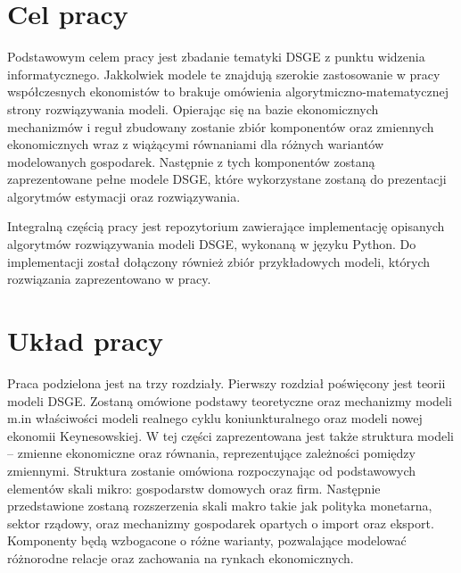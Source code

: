 \section*{Cel pracy}


Podstawowym celem pracy jest zbadanie tematyki DSGE z punktu widzenia informatycznego. Jakkolwiek modele te znajdują szerokie zastosowanie w pracy współczesnych ekonomistów to brakuje omówienia algorytmiczno-matematycznej strony rozwiązywania modeli. Opierając się na bazie ekonomicznych mechanizmów i reguł zbudowany zostanie zbiór komponentów oraz zmiennych ekonomicznych wraz z wiążącymi równaniami dla różnych wariantów modelowanych gospodarek. Następnie z tych komponentów zostaną zaprezentowane pełne modele DSGE, które wykorzystane zostaną do prezentacji algorytmów estymacji oraz rozwiązywania.



Integralną częścią pracy jest repozytorium zawierające implementację opisanych algorytmów rozwiązywania modeli DSGE, wykonaną w języku Python. Do implementacji został dołączony również zbiór przykładowych modeli, których rozwiązania zaprezentowano w pracy.

\section*{Układ pracy}

Praca podzielona jest na trzy rozdziały. Pierwszy rozdział poświęcony jest teorii modeli DSGE. Zostaną omówione podstawy teoretyczne oraz mechanizmy modeli m.in właściwości modeli realnego cyklu koniunkturalnego oraz modeli nowej ekonomii Keynesowskiej. W tej części zaprezentowana jest także struktura modeli -- zmienne ekonomiczne oraz równania, reprezentujące zależności pomiędzy zmiennymi. Struktura zostanie omówiona rozpoczynając od podstawowych elementów skali mikro: gospodarstw domowych oraz firm. Następnie przedstawione zostaną rozszerzenia skali makro takie jak polityka monetarna, sektor rządowy, oraz mechanizmy gospodarek opartych o import oraz eksport. Komponenty będą wzbogacone o różne warianty, pozwalające modelować różnorodne relacje oraz zachowania na rynkach ekonomicznych. 


